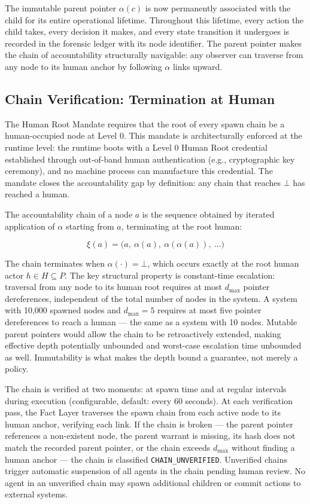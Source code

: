 The immutable parent pointer $\alpha(c)$ is now permanently associated with the child for its entire operational lifetime. Throughout this lifetime, every action the child takes, every decision it makes, and every state transition it undergoes is recorded in the forensic ledger with its node identifier. The parent pointer makes the chain of accountability structurally navigable: any observer can traverse from any node to its human anchor by following $\alpha$ links upward.

\subsection{Chain Verification: Termination at Human}

The Human Root Mandate requires that the root of every spawn chain be a human-occupied node at Level 0. This mandate is architecturally enforced at the runtime level: the runtime boots with a Level 0 Human Root credential established through out-of-band human authentication (e.g., cryptographic key ceremony), and no machine process can manufacture this credential. The mandate closes the accountability gap by definition: any chain that reaches $\bot$ has reached a human.

The accountability chain of a node $a$ is the sequence obtained by iterated application of $\alpha$ starting from $a$, terminating at the root human:

\begin{equation}
\xi(a) = \bigl( a,\ \alpha(a),\ \alpha(\alpha(a)),\ \ldots \bigr)
\end{equation}

The chain terminates when $\alpha(\cdot) = \bot$, which occurs exactly at the root human actor $h \in H \subseteq P$. The key structural property is constant-time escalation: traversal from any node to its human root requires at most $d_{\max}$ pointer dereferences, independent of the total number of nodes in the system. A system with 10,000 spawned nodes and $d_{\max} = 5$ requires at most five pointer dereferences to reach a human — the same as a system with 10 nodes. Mutable parent pointers would allow the chain to be retroactively extended, making effective depth potentially unbounded and worst-case escalation time unbounded as well. Immutability is what makes the depth bound a guarantee, not merely a policy.

The chain is verified at two moments: at spawn time and at regular intervals during execution (configurable, default: every 60 seconds). At each verification pass, the Fact Layer traverses the spawn chain from each active node to its human anchor, verifying each link. If the chain is broken — the parent pointer references a non-existent node, the parent warrant is missing, its hash does not match the recorded parent pointer, or the chain exceeds $d_{\max}$ without finding a human anchor — the chain is classified \texttt{CHAIN\_UNVERIFIED}. Unverified chains trigger automatic suspension of all agents in the chain pending human review. No agent in an unverified chain may spawn additional children or commit actions to external systems.

